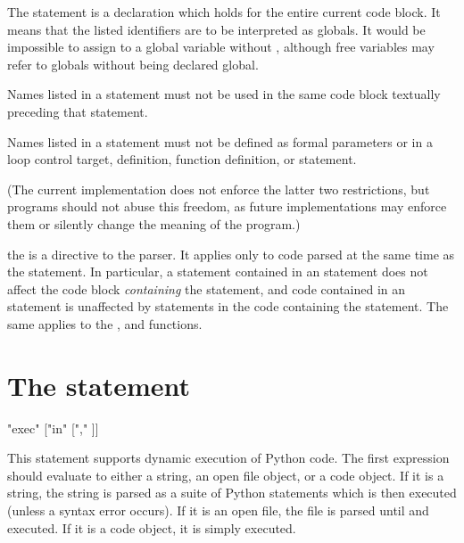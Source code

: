 The  statement is a declaration which holds for the
entire current code block.  It means that the listed identifiers are to be
interpreted as globals.  It would be impossible to assign to a global
variable without , although free variables may refer
to globals without being declared global.

Names listed in a  statement must not be used in the same
code block textually preceding that  statement.

Names listed in a  statement must not be defined as formal
parameters or in a  loop control target, 
definition, function definition, or  statement.

(The current implementation does not enforce the latter two
restrictions, but programs should not abuse this freedom, as future
implementations may enforce them or silently change the meaning of the
program.)

the  is a directive to the parser.  It
applies only to code parsed at the same time as the 
statement.  In particular, a  statement contained in an
 statement does not affect the code block \emph{containing}
the  statement, and code contained in an 
statement is unaffected by  statements in the code
containing the  statement.  The same applies to the
,  and  functions.


\section{The  statement \label{exec}}

\begin{productionlist}
             {"exec" 
              ["in"  ["," ]]}
\end{productionlist}

This statement supports dynamic execution of Python code.  The first
expression should evaluate to either a string, an open file object, or
a code object.  If it is a string, the string is parsed as a suite of
Python statements which is then executed (unless a syntax error
occurs).  If it is an open file, the file is parsed until \EOF{} and
executed.  If it is a code object, it is simply executed.

